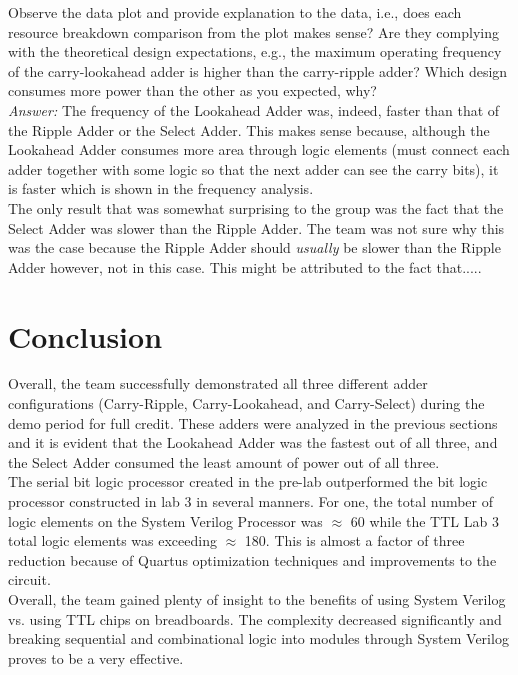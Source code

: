\documentclass[journal, twocolumn, final,11pt,letterpaper]{IEEEtran}
\begin{document}
Observe the data plot and provide explanation to the data, i.e., does each resource
breakdown comparison from the plot makes sense? Are they complying with the theoretical
design expectations, e.g., the maximum operating frequency of the carry-lookahead adder is
higher than the carry-ripple adder? Which design consumes more power than the other as you
expected, why?\\

\textit{Answer:} The frequency of the Lookahead Adder was, indeed, faster than that of the Ripple Adder or the Select Adder. This makes sense because, although the Lookahead Adder consumes more area through logic elements (must connect each adder together with some logic so that the next adder can see the carry bits), it is faster which is shown in the frequency analysis.\\

The only result that was somewhat surprising to the group was the fact that the Select Adder was slower than the Ripple Adder. The team was not sure why this was the case because the Ripple Adder should \textit{usually} be slower than the Ripple Adder however, not in this case. This might be attributed to the fact that.....

\section{Conclusion}
Overall, the team successfully demonstrated all three different adder configurations (Carry-Ripple, Carry-Lookahead, and Carry-Select) during the demo period for full credit. These adders were analyzed in the previous sections and it is evident that the Lookahead Adder was the fastest out of all three, and the Select Adder consumed the least amount of power out of all three.\\

The serial bit logic processor created in the pre-lab outperformed the bit logic processor constructed in lab 3 in several manners. For one, the total number of logic elements on the System Verilog Processor was $\approx$ 60 while the TTL Lab 3 total logic elements was exceeding $\approx$  180. This is almost a factor of three reduction because of Quartus optimization techniques and improvements to the circuit.\\ 

Overall, the team gained plenty of insight to the benefits of using System Verilog vs. using TTL chips on breadboards. The complexity decreased significantly and breaking sequential and combinational logic into modules through System Verilog proves to be a very effective. 
\end{document}
